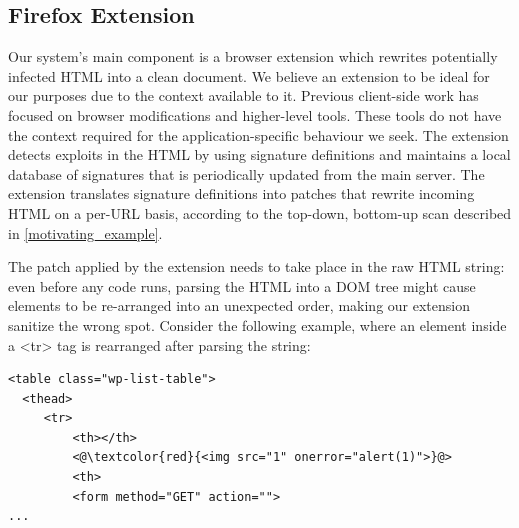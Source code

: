  
 \subsection{Firefox Extension} \label{firefox_extension}

 Our system's main component is a browser extension which rewrites
 potentially infected HTML into a clean document. We believe an
 extension to be ideal for our purposes due to the context available
 to it. Previous client-side work has focused on browser modifications
 and higher-level tools. These tools do not have the context required
 for the application-specific behaviour we seek. The extension detects
 exploits in the HTML by using signature definitions and maintains a
 local database of signatures that is periodically updated from the
 main server. The extension translates signature definitions into
 patches that rewrite incoming HTML on a per-URL basis, according to
 the top-down, bottom-up scan described in
 \autoref{motivating_example}.

The patch applied by the extension needs to take place in the raw HTML
string: even before any code runs, parsing the HTML into a DOM tree
might cause elements to be re-arranged into an unexpected order,
making our extension sanitize the wrong spot.  Consider the following
example, where an element inside a <tr> tag is rearranged after
parsing the string:

\begin{lstlisting}
<table class="wp-list-table">
  <thead>
     <tr>
	     <th></th>
	     <@\textcolor{red}{<img src="1" onerror="alert(1)">}@>
	     <th>
   	     <form method="GET" action="">
...
\end{lstlisting}

